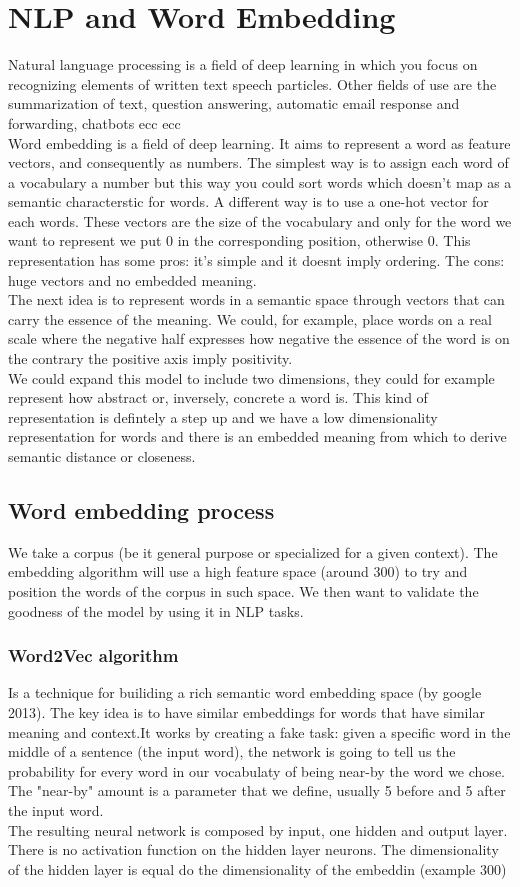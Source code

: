 \documentclass{article}
\begin{document}
\section{NLP and Word Embedding}
Natural language processing is a field of deep learning in which you focus on recognizing elements of written text speech particles. Other fields of use are the summarization of text, question answering, automatic email response and forwarding, chatbots ecc ecc\\
Word embedding is a field of deep learning. It aims to represent a word as feature vectors, and consequently as numbers. The simplest way is to assign each word of a vocabulary a number but this way you could sort words which doesn't map as a semantic characterstic for words. A different way is to use a one-hot vector for each words. These vectors are the size of the vocabulary and only for the word we want to represent we put 0 in the corresponding position, otherwise 0. This representation has some pros: it's simple and it doesnt imply ordering. The cons: huge vectors and no embedded meaning.\\
The next idea is to represent words in a semantic space through vectors that can carry the essence of the meaning. We could, for example, place words on a real scale where the negative half expresses how negative the essence of the word is on the contrary the positive axis imply positivity.\\ We could expand this model to include two dimensions, they could for example represent how abstract or, inversely, concrete a word is. This kind of representation is defintely a step up and we have a low dimensionality representation for words and there is an embedded meaning from which to derive semantic distance or closeness.
\subsection*{Word embedding process}
We take a corpus (be it general purpose or specialized for a given context). The embedding algorithm will use a high feature space (around 300) to try and position the words of the corpus in such space. We then want to validate the goodness of the model by using it in NLP tasks.\\
\subsubsection*{Word2Vec algorithm}
Is a technique for builiding a rich semantic word embedding space (by google 2013). The key idea is to have similar embeddings for words that have similar meaning and context.It works by creating a fake task: given a specific word in the middle of a sentence (the input word), the network is going to tell us the probability for every word in our vocabulaty of being near-by the word we chose. The "near-by" amount is a parameter that we define, usually 5 before and 5 after the input word. \\
The resulting neural network is composed by input, one hidden and output layer. There is no activation function on the hidden layer neurons. The dimensionality of the hidden layer is equal do the dimensionality of the embeddin (example 300)
\end{document}
